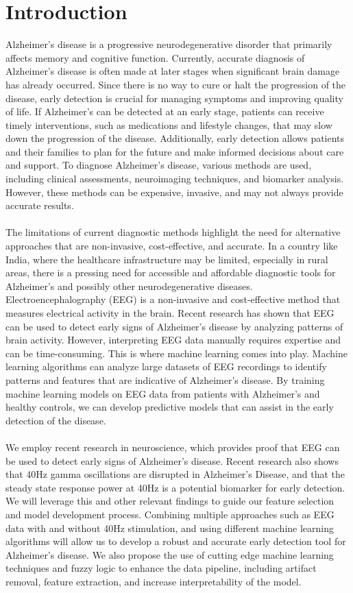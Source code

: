 \documentclass[openany]{book}
\begin{document}
\chapter*{Introduction}
    Alzheimer's disease is a progressive neurodegenerative disorder that primarily affects memory and cognitive function. Currently, accurate diagnosis of Alzheimer's disease is often made at later stages when significant brain damage has already occurred. Since there is no way to cure or halt the progression of the disease, early detection is crucial for managing symptoms and improving quality of life. If Alzheimer's can be detected at an early stage, patients can receive timely interventions, such as medications and lifestyle changes, that may slow down the progression of the disease. Additionally, early detection allows patients and their families to plan for the future and make informed decisions about care and support. To diagnose Alzheimer's disease, various methods are used, including clinical assessments, neuroimaging techniques, and biomarker analysis. However, these methods can be expensive, invasive, and may not always provide accurate results. \\ \\ The limitations of current diagnostic methods highlight the need for alternative approaches that are non-invasive, cost-effective, and accurate. In a country like India, where the healthcare infrastructure may be limited, especially in rural areas, there is a pressing need for accessible and affordable diagnostic tools for Alzheimer's and possibly other neurodegenerative diseases. Electroencephalography (EEG) is a non-invasive and cost-effective method that measures electrical activity in the brain. Recent research has shown that EEG can be used to detect early signs of Alzheimer's disease by analyzing patterns of brain activity. However, interpreting EEG data manually requires expertise and can be time-consuming. This is where machine learning comes into play. Machine learning algorithms can analyze large datasets of EEG recordings to identify patterns and features that are indicative of Alzheimer's disease. By training machine learning models on EEG data from patients with Alzheimer's and healthy controls, we can develop predictive models that can assist in the early detection of the disease. \\ \\
    We employ recent research in neuroscience, which provides proof that EEG can be used to detect early signs of Alzheimer's disease. Recent research also shows that 40Hz gamma oscillations are disrupted in Alzheimer's Disease, and that the steady state response power at 40Hz is a potential biomarker for early detection. We will leverage this and other relevant findings to guide our feature selection and model development process. Combining multiple approaches such as EEG data with and without 40Hz stimulation, and using different machine learning algorithms will allow us to develop a robust and accurate early detection tool for Alzheimer's disease. We also propose the use of cutting edge machine learning techniques and fuzzy logic to enhance the data pipeline, including artifact removal, feature extraction, and increase interpretability of the model. \\\\
\end{document}
